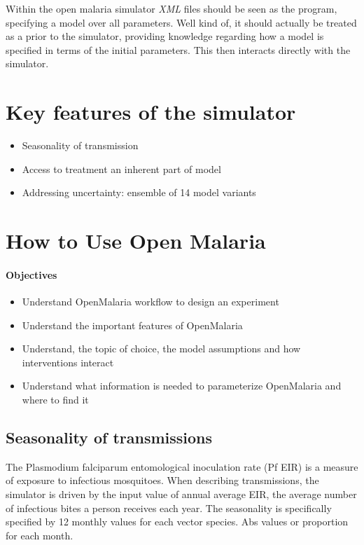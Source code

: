 \documentclass[]{scrartcl}
\begin{document}
\begin{itemize}
Within the open malaria simulator \textit{XML} files should be seen as the program, specifying a model over all parameters. Well kind of, it should actually be treated as a prior to the simulator, providing knowledge regarding how a model is specified in terms of the initial parameters. This then interacts directly with the simulator. 


\section{Key features of the simulator}

\begin{itemize}
\item Seasonality of transmission
\item Access to treatment an inherent part of model
\item Addressing uncertainty: ensemble of 14 model variants

\end{itemize}
\section{How to Use Open Malaria}

\paragraph*{Objectives}
\begin{itemize}
	\item Understand OpenMalaria workflow to design an experiment
	\item Understand the important features of OpenMalaria
	\item Understand, the topic of choice, the model assumptions and how interventions interact 
	\item Understand what information is needed to parameterize OpenMalaria and where to find it
\end{itemize}


\subsection{Seasonality of transmissions}
The Plasmodium falciparum entomological inoculation rate (Pf EIR) is a measure of exposure to infectious mosquitoes. 
When describing transmissions, the simulator is driven by the input value of annual average EIR, the average number of infectious bites a person receives each year.
The seasonality is specifically specified by 12 monthly values for each vector species. Abs values or proportion for each month.


\end{itemize}
\end{document}
